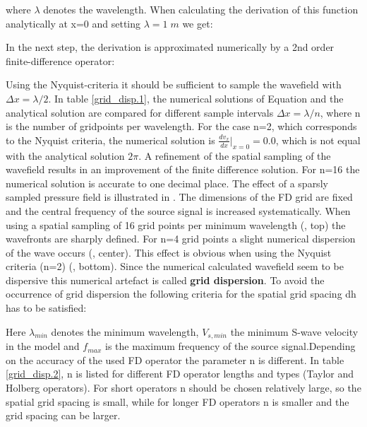 \documentclass[11pt,onecolumn,oneside]{article}
\begin{document}

where $\lambda$ denotes the wavelength. When calculating the derivation of this function analytically at x=0 and setting $\lambda=1\;m$ we get:


In the next step, the derivation is approximated numerically by a 2nd order finite-difference operator:


Using the Nyquist-criteria it should be sufficient to sample the wavefield with $\Delta x = \lambda/2$. In table \ref{grid_disp.1}, the numerical solutions of Equation  and the analytical solution  are compared for different sample intervals  $\Delta x = \lambda /n$, where n is the number of gridpoints per wavelength. For the case n=2, which corresponds to the Nyquist criteria, the numerical solution is $\frac{d v_x}{d x}|_{x=0}=0.0$, which is not equal with the analytical solution $2 \pi$. A refinement of the spatial sampling of the wavefield results in an improvement of the finite difference solution. For n=16 the numerical solution is accurate to one decimal place. The effect of a sparsly sampled pressure field is illustrated in . The dimensions of the FD grid are fixed and the central frequency of the source signal is increased systematically.  When using a spatial sampling of 16 grid points per minimum wavelength (, top) the wavefronts are sharply defined. For n=4  grid points a slight numerical dispersion of the wave occurs (, center). This effect is obvious when using the Nyquist criteria (n=2)  (, bottom). Since the numerical calculated wavefield seem to be dispersive this numerical artefact is called {\bf{grid dispersion}}. To avoid the occurrence of grid dispersion the following criteria for the spatial grid spacing dh has to be satisfied:


Here $\lambda_{min}$ denotes the minimum wavelength, $V_{s,min}$ the minimum S-wave velocity in the model and $f_{max}$ is the maximum frequency of the source signal.Depending on the accuracy of the used FD operator the parameter n is different.  In table \ref{grid_disp.2}, n is listed for different FD operator lengths  and types (Taylor and Holberg operators). For short operators n should be chosen relatively large, so the spatial grid spacing is small, while for longer FD operators n is smaller and the grid spacing can be larger.            
\end{document}
